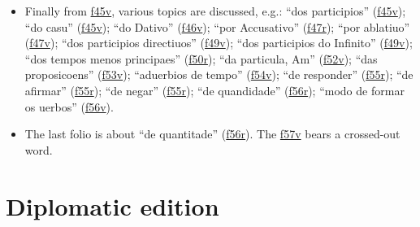 \documentclass[12pt,a4paper]{scrbook}
\begin{document}
\begin{itemize}
                     
\item Finally from \hyperlink{img-100}{f45v}, various topics are discussed, e.g.: “dos participios” (\hyperlink{img-100}{f45v}); “do casu” (\hyperlink{img-100}{f45v}); “do Dativo” (\hyperlink{img-102}{f46v}); “por Accusativo” (\hyperlink{img-103}{f47r}); “por ablatiuo” (\hyperlink{img-104}{f47v}); “dos participios directiuos” (\hyperlink{img-108}{f49v}); “dos participios do Infinito” (\hyperlink{img-108}{f49v}); “dos tempos menos principaes” (\hyperlink{img-109}{f50r}); “da particula, Am” (\hyperlink{img-114}{f52v}); “das proposicoens” (\hyperlink{img-116}{f53v}); “aduerbios de tempo” (\hyperlink{img-118}{f54v}); “de responder” (\hyperlink{img-119}{f55r}); “de afirmar” (\hyperlink{img-119}{f55r}); “de negar” (\hyperlink{img-119}{f55r}); “de quandidade” (\hyperlink{img-121}{f56r}); “modo de formar os uerbos” (\hyperlink{img-122}{f56v}).
    
                         
\item The last folio is about “de quantitade” (\hyperlink{img-121}{f56r}). The \hyperlink{img-123}{f57v} bears a crossed-out word.
    
                        
\end{itemize}
    
                    
\cleardoublepage
\makeatletter\@openrightfalse
\part{Diplomatic edition}
    
    
    	
\end{document}
